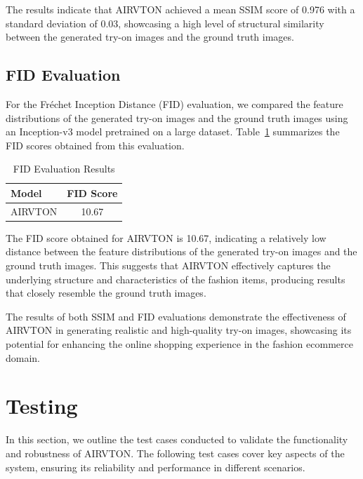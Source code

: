 The results indicate that AIRVTON achieved a mean SSIM score of 0.976 with a standard deviation of 0.03, showcasing a high level of structural similarity between the generated try-on images and the ground truth images.

\subsection{FID Evaluation}

For the Fréchet Inception Distance (FID) evaluation, we compared the feature distributions of the generated try-on images and the ground truth images using an Inception-v3 model pretrained on a large dataset. Table~\ref{tab:fid_results} summarizes the FID scores obtained from this evaluation.

\begin{table}[htbp]
  \caption{FID Evaluation Results}
  \label{tab:fid_results}
  \centering
  \begin{tabular}{lc}
    \toprule
    \textbf{Model} & \textbf{FID Score} \\
    \midrule
    AIRVTON & 10.67 \\
    \bottomrule
  \end{tabular}
\end{table}

The FID score obtained for AIRVTON is 10.67, indicating a relatively low distance between the feature distributions of the generated try-on images and the ground truth images. This suggests that AIRVTON effectively captures the underlying structure and characteristics of the fashion items, producing results that closely resemble the ground truth images.

The results of both SSIM and FID evaluations demonstrate the effectiveness of AIRVTON in generating realistic and high-quality try-on images, showcasing its potential for enhancing the online shopping experience in the fashion ecommerce domain.

\section{Testing}

In this section, we outline the test cases conducted to validate the functionality and robustness of AIRVTON. The following test cases cover key aspects of the system, ensuring its reliability and performance in different scenarios.

